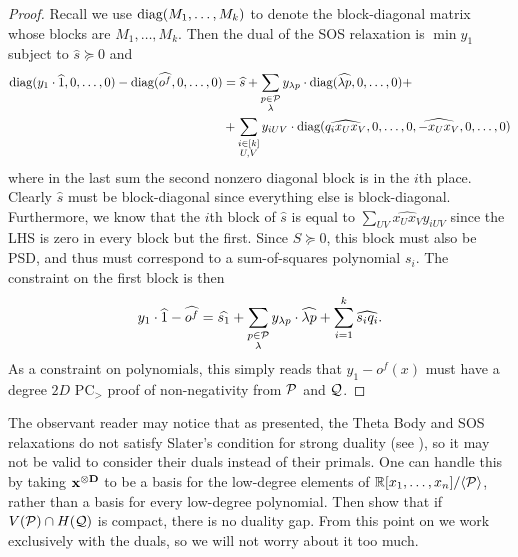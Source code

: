\begin{proof}
Recall we use $\text{diag}(M_1,\dots,M_k)$ to denote the block-diagonal matrix whose blocks are $M_1,\dots,M_k$. Then the dual of the SOS relaxation is $\min y_1$ subject to $\hat{s} \succeq 0$ and
\begin{align*}
\text{diag}(y_1 \cdot \widehat{1},0,\dots,0) - \text{diag}(\widehat{o^f},0,\dots,0) &= \widehat{s} + \sum_{\substack{p \in \mathcal P \\ \lambda}}  y_{\lambda p}\cdot \text{diag}(\widehat{\lambda p},0,\dots,0) +\\
&+ \sum_{\substack{i \in [k] \\ U,V}} y_{iUV}\cdot \text{diag}(\widehat{q_ix_Ux_V},0,\dots,0,\widehat{-x_Ux_V},0,\dots,0)
\end{align*}
where in the last sum the second nonzero diagonal block is in the $i$th place. Clearly $\widehat{s}$ must be block-diagonal since everything else is block-diagonal. Furthermore, we know that the $i$th block of $\widehat{s}$ is equal to $\sum_{UV} \widehat{x_Ux_V}y_{iUV}$ since the LHS is zero in every block but the first. Since $S \succeq 0$, this block must also be PSD, and thus must correspond to a sum-of-squares polynomial $s_i$. The constraint on the first block is then
\[y_1 \cdot \widehat{1} - \widehat{o^f} = \widehat{s_1} + \sum_{\substack{p \in \mathcal P \\ \lambda}} y_{\lambda p}\cdot \widehat{\lambda p}  + \sum_{i=1}^k \widehat{s_i q_i}.\]
As a constraint on polynomials, this simply reads that $y_1 - o^f(x)$ must have a degree $2D$ PC$_>$ proof of non-negativity from $\mathcal P$ and $\mathcal Q$.
\end{proof}

\begin{remark}
The observant reader may notice that as presented, the Theta Body and SOS relaxations do not satisfy Slater's condition for strong duality (see ), so it may not be valid to consider their duals instead of their primals. One can handle this by taking $\mathbf{x^{\otimes D}}$ to be a basis for the low-degree elements of $\mathbb R[x_1,\dots,x_n]/\langle \mathcal P \rangle$, rather than a basis for every low-degree polynomial. Then \cite{JH16} show that if $V(\mathcal P) \cap H(\mathcal Q)$ is compact, there is no duality gap. From this point on we work exclusively with the duals, so we will not worry about it too much.
\end{remark}

